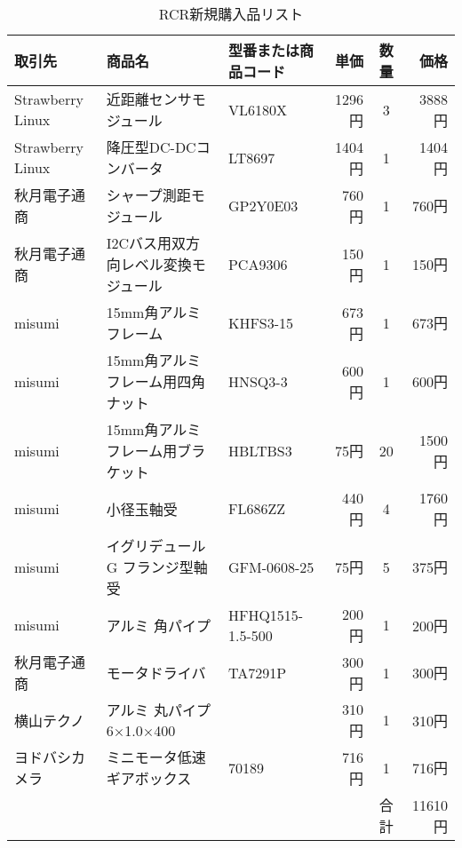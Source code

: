 \newpage
\begin{table}[H]
\begin{center}
   \caption{RCR新規購入品リスト}
 \label{tab:list2}
  \begin{tabular}{|l|l|l|r|c|r|}  \hline
  取引先 & 商品名 & 型番または商品コード & 単価 & 数量 & 価格 \\   \hline \hline
  Strawberry Linux & 近距離センサモジュール & VL6180X & 1296円 & 3 & 3888円 \\    \hline
  Strawberry Linux & 降圧型DC-DCコンバータ & LT8697 & 1404円 & 1 & 1404円  \\      \hline
  秋月電子通商 & シャープ測距モジュール & GP2Y0E03 & 760円 & 1 & 760円  \\      \hline
  秋月電子通商 & I2Cバス用双方向レベル変換モジュール & PCA9306 & 150円 & 1 & 150円  \\      \hline
  misumi & 15mm角アルミフレーム & KHFS3-15 & 673円 & 1 & 673円  \\      \hline
  misumi & 15mm角アルミフレーム用四角ナット & HNSQ3-3 & 600円 & 1 & 600円  \\       \hline
  misumi & 15mm角アルミフレーム用ブラケット & HBLTBS3 & 75円 & 20 & 1500円  \\      \hline
  misumi & 小径玉軸受 & FL686ZZ & 440円 & 4 & 1760円  \\      \hline
  misumi & イグリデュールG フランジ型軸受 & GFM-0608-25 & 75円 & 5 & 375円 \\     \hline
  misumi & アルミ 角パイプ & HFHQ1515-1.5-500 & 200円 & 1 & 200円  \\       \hline
  秋月電子通商 & モータドライバ & TA7291P & 300円 & 1 & 300円  \\      \hline
  横山テクノ & アルミ 丸パイプ 6×1.0×400 & & 310円 & 1 & 310円 \\        \hline
  ヨドバシカメラ & ミニモータ低速ギアボックス & 70189 & 716円 & 1 & 716円  \\      \hline
 & & & & 合計 & 11610円  \\      \hline
 \end{tabular}
\end{center}
\end{table}

